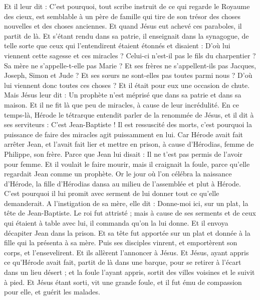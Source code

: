 \begin{multicols}{2}
Et il leur dit : C'est pourquoi, tout scribe instruit de ce qui regarde le Royaume des cieux, est semblable à un père de famille qui tire de son trésor des choses nouvelles et des choses anciennes.
Et quand Jésus eut achevé ces paraboles, il partit de là.
Et s'étant rendu dans sa patrie, il enseignait dans la synagogue, de telle sorte que ceux qui l'entendirent étaient étonnés et disaient : D'où lui viennent cette sagesse et ces miracles ?
Celui-ci n'est-il pas le fils du charpentier ? Sa mère ne s'appelle-t-elle pas Marie ? Et ses frères ne s'appellent-ils pas Jacques, Joseph, Simon et Jude ?
Et ses sœurs ne sont-elles pas toutes parmi nous ? D'où lui viennent donc toutes ces choses ?
Et il était pour eux une occasion de chute. Mais Jésus leur dit : Un prophète n'est méprisé que dans sa patrie et dans sa maison.
Et il ne fit là que peu de miracles, à cause de leur incrédulité.
\VerseOne{}En ce temps-là, Hérode le tétrarque entendit parler de la renommée de Jésus, et il dit à ses serviteurs : C'est Jean-Baptiste !
Il est ressuscité des morts, c'est pourquoi la puissance de faire des miracles agit puissamment en lui.
Car Hérode avait fait arrêter Jean, et l'avait fait lier et mettre en prison, à cause d'Hérodias, femme de Philippe, son frère.
Parce que Jean lui disait : Il ne t'est pas permis de l'avoir pour femme.
Et il voulait le faire mourir, mais il craignait la foule, parce qu'elle regardait Jean comme un prophète.
Or le jour où l'on célébra la naissance d'Hérode, la fille d'Hérodias dansa au milieu de l'assemblée et plut à Hérode.
C'est pourquoi il lui promit avec serment de lui donner tout ce qu'elle demanderait.
A l'instigation de sa mère, elle dit : Donne-moi ici, sur un plat, la tête de Jean-Baptiste.
Le roi fut attristé ; mais à cause de ses serments et de ceux qui étaient à table avec lui, il commanda qu'on la lui donne.
Et il envoya décapiter Jean dans la prison.
Et sa tête fut apportée sur un plat et donnée à la fille qui la présenta à sa mère.
Puis ses disciples vinrent, et emportèrent son corps, et l'ensevelirent. Et ils allèrent l'annoncer à Jésus.
Et Jésus, ayant appris ce qu'Hérode avait fait, partit de là dans une barque, pour se retirer à l'écart dans un lieu désert ; et la foule l'ayant appris, sortit des villes voisines et le suivit à pied.
Et Jésus étant sorti, vit une grande foule, et il fut ému de compassion pour elle, et guérit les malades.

\end{multicols}
